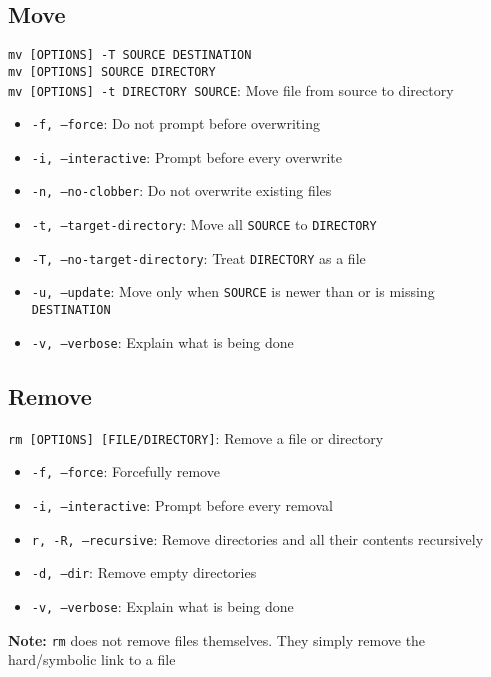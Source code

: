\documentclass[13pt]{article}
\begin{document}
\subsection{Move}
\texttt{mv [OPTIONS] -T SOURCE DESTINATION} \\
\texttt{mv [OPTIONS] SOURCE DIRECTORY} \\
\texttt{mv [OPTIONS] -t DIRECTORY SOURCE}: Move file from source to directory
\begin{itemize}[leftmargin = 0pt]
\item [] \texttt{-f, --force}: Do not prompt before overwriting
\item [] \texttt{-i, --interactive}: Prompt before every overwrite
\item [] \texttt{-n, --no-clobber}: Do not overwrite existing files
\item [] \texttt{-t, --target-directory}: Move all \texttt{SOURCE} to \texttt{DIRECTORY}
\item [] \texttt{-T, --no-target-directory}: Treat \texttt{DIRECTORY} as a file
\item [] \texttt{-u, --update}: Move only when \texttt{SOURCE} is newer than or is missing \texttt{DESTINATION}
\item [] \texttt{-v, --verbose}: Explain what is being done
\end{itemize}

\subsection{Remove}
\texttt{rm [OPTIONS] [FILE/DIRECTORY]}: Remove a file or directory
\begin{itemize}[leftmargin = 0pt]
\item [] \texttt{-f, --force}: Forcefully remove
\item [] \texttt{-i, --interactive}: Prompt before every removal
\item [] \texttt{r, -R, --recursive}: Remove directories and all their contents recursively
\item [] \texttt{-d, --dir}: Remove empty directories
\item [] \texttt{-v, --verbose}: Explain what is being done
\end{itemize}
\textbf{Note:} \texttt{rm} does not remove files themselves. They simply remove the hard/symbolic link to a file
\end{document}
